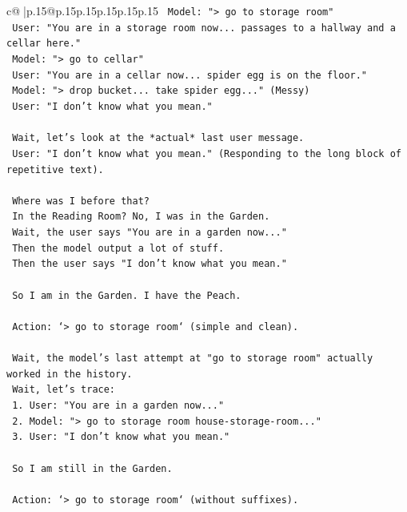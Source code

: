 \documentclass{article}
\begin{document}
{\begin{supertabular}{c@{$\;$}|p{.15\linewidth}@{}p{.15\linewidth}p{.15\linewidth}p{.15\linewidth}p{.15\linewidth}p{.15\linewidth}}
{{{\texttt{    Model: "> go to storage room"} \\
\texttt{    User: "You are in a storage room now... passages to a hallway and a cellar here."} \\
\texttt{    Model: "> go to cellar"} \\
\texttt{    User: "You are in a cellar now... spider egg is on the floor."} \\
\texttt{    Model: "> drop bucket... take spider egg..." (Messy)} \\
\texttt{    User: "I don't know what you mean."} \\
\\ 
\texttt{    Wait, let's look at the *actual* last user message.} \\
\texttt{    User: "I don't know what you mean." (Responding to the long block of repetitive text).} \\
\\ 
\texttt{    Where was I before that?} \\
\texttt{    In the Reading Room? No, I was in the Garden.} \\
\texttt{    Wait, the user says "You are in a garden now..."} \\
\texttt{    Then the model output a lot of stuff.} \\
\texttt{    Then the user says "I don't know what you mean."} \\
\\ 
\texttt{    So I am in the Garden. I have the Peach.} \\
\\ 
\texttt{    Action: `> go to storage room` (simple and clean).} \\
\\ 
\texttt{    Wait, the model's last attempt at "go to storage room" actually worked in the history.} \\
\texttt{    Wait, let's trace:} \\
\texttt{    1. User: "You are in a garden now..."} \\
\texttt{    2. Model: "> go to storage room house{-}storage{-}room..."} \\
\texttt{    3. User: "I don't know what you mean."} \\
\\ 
\texttt{    So I am still in the Garden.} \\
\\ 
\texttt{    Action: `> go to storage room` (without suffixes).} \\
\\ 
}}}
\end{supertabular}}
\end{document}
